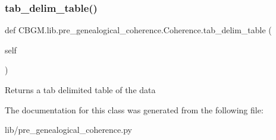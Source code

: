 \subsubsection{\texorpdfstring{tab\+\_\+delim\+\_\+table()}{tab\_delim\_table()}}
{\footnotesize\ttfamily def C\+B\+G\+M.\+lib.\+pre\+\_\+genealogical\+\_\+coherence.\+Coherence.\+tab\+\_\+delim\+\_\+table (\begin{DoxyParamCaption}\item[{}]{self }\end{DoxyParamCaption})}

\begin{DoxyVerb}Returns a tab delimited table of the data
\end{DoxyVerb}
 

The documentation for this class was generated from the following file\+:\begin{DoxyCompactItemize}
\item 
lib/pre\+\_\+genealogical\+\_\+coherence.\+py\end{DoxyCompactItemize}
